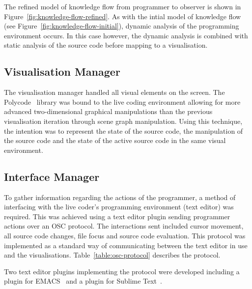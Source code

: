 The refined model of knowledge flow from programmer to observer is shown in Figure~\ref{fig:knowledge-flow-refined}. As with the intial model of knowledge flow (see Figure~\ref{fig:knowledge-flow-initial}), dynamic analysis of the programming environment occurs. In this case however, the dynamic analysis is combined with static analysis of the source code before mapping to a visualisation.

\subsection{Visualisation Manager}

The visualisation manager handled all visual elements on the screen. The Polycode~\cite{Safrin2013} library was bound to the live coding environment allowing for more advanced two-dimensional graphical manipulations than the previous visualisation iteration through scene graph manipulation. Using this technique, the intention was to represent the state of the source code, the manipulation of the source code and the state of the active source code in the same visual environment.

\subsection{Interface Manager}
\label{sec:interface-manager}

To gather information regarding the actions of the programmer, a method of interfacing with the live coder's programming environment (text editor) was required. This was achieved using a text editor plugin sending programmer actions over an \ac{OSC} protocol. The interactions sent included cursor movement, all source code changes, file focus and source code evaluation. This protocol was implemented as a standard way of communicating between the text editor in use and the visualisations. Table~\ref{table:osc-protocol} describes the protocol.

Two text editor plugins implementing the protocol were developed including a plugin for EMACS~\cite{Stallman1981} and a plugin for Sublime Text~\cite{Skinner2013}.

